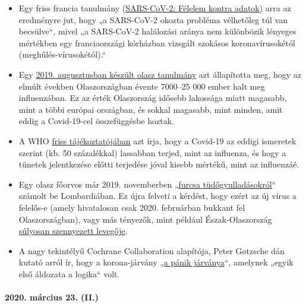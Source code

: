 \begin{itemize}
\tightlist
\item
  Egy friss francia tanulmány
  (\href{https://www.sciencedirect.com/science/article/abs/pii/S0924857920300972}{SARS-CoV-2:
  Félelem kontra adatok}) arra az eredményre jut, hogy „a SARS-CoV-2
  okozta probléma vélhetőleg túl van becsülve``, mivel „a SARS-CoV-2
  halálozási aránya nem különbözik lényeges mértékben egy franciaországi
  kórházban vizsgált szokásos koronavírusokétól
  (meghűlés-vírusokétól).``
\item
  Egy
  \href{https://www.ijidonline.com/article/S1201-9712(19)30328-5/fulltext}{2019.
  augusztusban készült olasz tanulmány} azt állapította meg, hogy az
  elmúlt években Olaszországban évente 7000--25 000 ember halt meg
  influenzában. Ez az érték Olaszország idősebb lakossága miatt
  magasabb, mint a többi európai országban, és sokkal magasabb, mint
  minden, amit eddig a Covid-19-cel összefüggésbe hoztak.
\item
  A WHO
  \href{https://www.who.int/news-room/q-a-detail/q-a-similarities-and-differences-covid-19-and-influenza}{friss
  tájékoztatójában} azt írja, hogy a Covid-19 az eddigi ismeretek
  szerint (kb. 50 százalékkal) lassabban terjed, mint az influenza, és
  hogy a tünetek jelentkezése előtti terjedése jóval kisebb mértékű,
  mint az influenzáé.
\item
  Egy olasz főorvos már 2019. novemberben
  „\href{https://www.scmp.com/news/china/society/article/3076334/coronavirus-strange-pneumonia-seen-lombardy-november-leading}{furcsa
  tüdőgyulladásokról}`` számolt be Lombardiában. Ez újra felveti a
  kérdést, hogy ezért az új vírus a felelős-e (amely hivatalosan csak
  2020. februárban bukkant fel Olaszországban), vagy más tényezők, mint
  például Észak-Olaszország
  \href{https://www.thelocal.it/20170131/our-lungs-are-breaking-smog-levels-way-above-safe-limits-in-northern-italy}{súlyosan
  szennyezett levegője}.
\item
  A nagy tekintélyű Cochrane Collaboration alapítója, Peter Gøtzsche dán
  kutató arról ír, hogy a korona-járvány
  „\href{https://www.deadlymedicines.dk/corona-an-epidemic-of-mass-panic/}{a
  pánik járványa}``, amelynek „egyik első áldozata a logika`` volt.
\end{itemize}

\hypertarget{2020-muxe1rcius-23-ii}{%
\paragraph{2020. március 23. (II.)}\label{2020-muxe1rcius-23-ii}}

